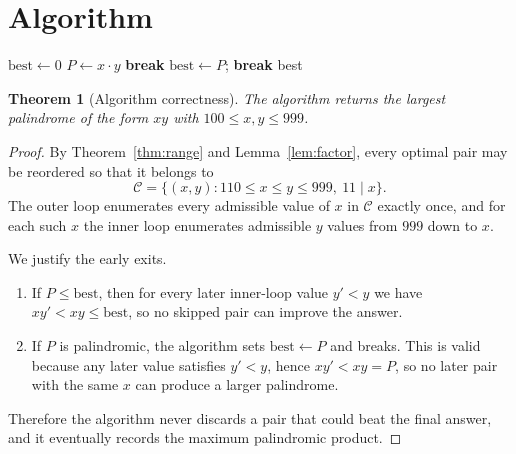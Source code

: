 \documentclass[11pt]{article}
\newtheorem{theorem}{Theorem}
\begin{document}
\section{Algorithm}

\begin{algorithm}[H]
\caption{Largest palindrome product of two 3-digit numbers}
\begin{algorithmic}[1]
\STATE $\text{best} \gets 0$
        \STATE $P \gets x \cdot y$
            \STATE \textbf{break} 
        \ENDIF
            \STATE $\text{best} \gets P$; \textbf{break}
        \ENDIF
    \ENDFOR
\ENDFOR
\RETURN best
\end{algorithmic}
\end{algorithm}

\begin{theorem}[Algorithm correctness]
The algorithm returns the largest palindrome of the form $xy$ with $100 \le x,y \le 999$.
\end{theorem}

\begin{proof}
By Theorem~\ref{thm:range} and Lemma~\ref{lem:factor}, every optimal pair may be reordered so that it belongs to
\[
\mathcal{C} = \{(x,y) : 110 \le x \le y \le 999,\ 11 \mid x\}.
\]
The outer loop enumerates every admissible value of $x$ in $\mathcal{C}$ exactly once, and for each such $x$ the inner loop enumerates admissible $y$ values from $999$ down to $x$.

We justify the early exits.
\begin{enumerate}
\item If $P \le \text{best}$, then for every later inner-loop value $y' < y$ we have $xy' < xy \le \text{best}$, so no skipped pair can improve the answer.
\item If $P$ is palindromic, the algorithm sets $\text{best} \gets P$ and breaks. This is valid because any later value satisfies $y' < y$, hence $xy' < xy = P$, so no later pair with the same $x$ can produce a larger palindrome.
\end{enumerate}

Therefore the algorithm never discards a pair that could beat the final answer, and it eventually records the maximum palindromic product.
\end{proof}
\end{document}
